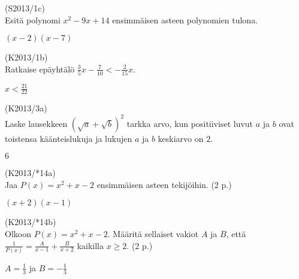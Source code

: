 \begin{tehtava}
(S2013/1c) \\ Esitä polynomi $x^2-9x+14$ ensimmäisen asteen polynomien tulona.
\begin{vastaus}
$(x-2)(x-7)$
\end{vastaus}
\end{tehtava}

\begin{tehtava}
(K2013/1b) \\ Ratkaise epäyhtälö $\frac{3}{5}x-\frac{7}{10} < -\frac{2}{15}x$.
\begin{vastaus}
$x<\frac{21}{22}$
\end{vastaus}
\end{tehtava}

\begin{tehtava}
(K2013/3a) \\ Laske lausekkeen $(\sqrt{a}+\sqrt{b})^2$ tarkka arvo, kun positiiviset luvut $a$ ja $b$ ovat toistensa käänteislukuja ja lukujen $a$ ja $b$ keskiarvo on $2$.
\begin{vastaus}
$6$
\end{vastaus}
\end{tehtava}

\begin{tehtava}
(K2013/*14a) \\ Jaa $P(x)=x^2+x-2$ ensimmäisen asteen tekijöihin. (2 p.)
\begin{vastaus}
$(x+2)(x-1)$
\end{vastaus}
\end{tehtava}

\begin{tehtava}
(K2013/*14b) \\ Olkoon $P(x)=x^2+x-2$. Määritä sellaiset vakiot $A$ ja $B$, että $\frac{1}{P(x)}=\frac{A}{x-1}+\frac{B}{x+2} $ kaikilla $x \geq 2$. (2 p.)
\begin{vastaus}
$A= \frac{1}{3}$ ja $B=- \frac{1}{3}$
\end{vastaus}
\end{tehtava}



  

